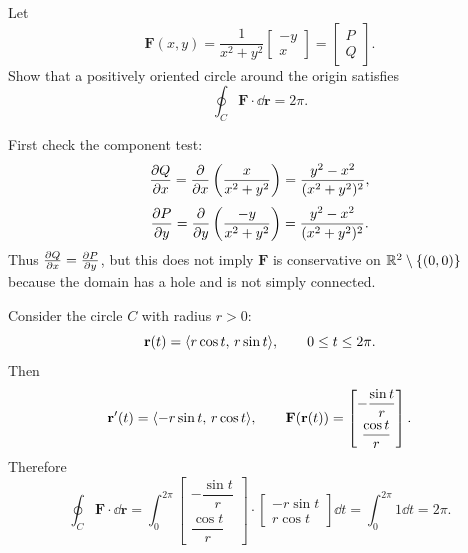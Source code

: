 \begin{example}
  Let
  \[
    \mathbf{F}(x,y)
    =
    \frac{1}{x^2+y^2}
    \begin{bmatrix}
      -y \\
      x
    \end{bmatrix}
    =
    \begin{bmatrix}
      P \\
      Q
    \end{bmatrix}
    .
  \]
  Show that a positively oriented circle around the origin satisfies
  \[
    \oint_C \mathbf{F}\cdot\dd{\mathbf{r}} = 2\pi.
  \]

  First check the component test:
  \[
    \frac{\partial Q}{\partial x}
    =
    \frac{\partial }{\partial x}\left(\frac{x}{x^2+y^2}\right)
    =
    \frac{y^2-x^2}{(x^2+y^2)^2},
  \]
  \[
    \frac{\partial P}{\partial y}
    =
    \frac{\partial }{\partial y}\left(\frac{-y}{x^2+y^2}\right)
    =
    \frac{y^2-x^2}{(x^2+y^2)^2}.
  \]
  Thus $\frac{\partial Q}{\partial x}=\frac{\partial P}{\partial y}$, but this does not imply $\mathbf{F}$ is conservative
  on $\mathbb{R}^2\setminus\{(0,0)\}$ because the domain has a hole and is not simply
  connected.

  Consider the circle $C$ with radius $r>0$:
  \[
    \mathbf{r}(t)=\langle r\cos t,\, r\sin t \rangle,
    \qquad 0\leq t\leq 2\pi.
  \]
  Then
  \[
    \mathbf{r}'(t)=\langle -r\sin t,\, r\cos t \rangle,
    \qquad
    \mathbf{F}(\mathbf{r}(t))
    =
    \begin{bmatrix}
      -\dfrac{\sin t}{r} \\[6pt]
      \dfrac{\cos t}{r}
    \end{bmatrix}
    .
  \]
  Therefore
  \[
    \oint_C \mathbf{F}\cdot\dd{\mathbf{r}}
    =
    \int_0^{2\pi}
    \begin{bmatrix}
      -\dfrac{\sin t}{r} \\[6pt]
      \dfrac{\cos t}{r}
    \end{bmatrix}
    \cdot
    \begin{bmatrix}
      -r\sin t \\
      r\cos t
    \end{bmatrix}
    \dd{t}
    =
    \int_0^{2\pi} 1\dd{t}
    =
    2\pi.
  \]

  \begin{center}
  \end{center}
\end{example}

